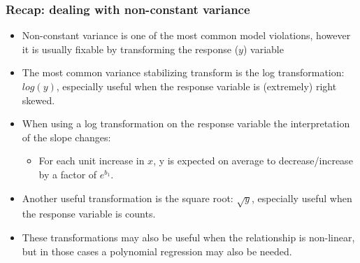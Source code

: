 \documentclass[slidestop,compress,mathserif,12pt,t,professionalfonts,xcolor=table]{beamer}
\begin{document}
\begin{frame}
\frametitle{Recap: dealing with non-constant variance}

\begin{itemize}

\item Non-constant variance is one of the most common model violations, however it is usually fixable by transforming the response ($y$) variable

\pause

\item The most common variance stabilizing transform is the log transformation: $log(y)$, especially useful when the response variable is (extremely) right skewed.

\pause

\item When using a log transformation on the response variable the interpretation of the slope changes: \pause
\begin{itemize}
\item For each unit increase in $x$, y is expected on average to decrease/increase by a factor of $e^{b_1}$.
\end{itemize}

\pause

\item Another useful transformation is the square root: $\sqrt{y}$, especially useful when the response variable is counts.

\pause

\item These transformations may also be useful when the relationship is non-linear, but in those cases a polynomial regression may also be needed.

\end{itemize}

\end{frame}


\end{document}
